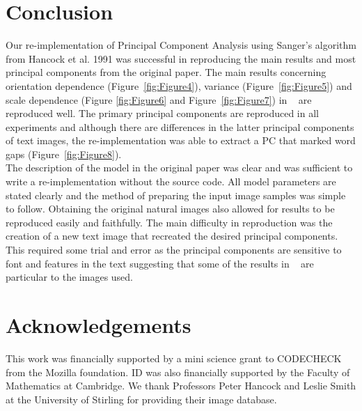 \section{Conclusion}
Our re-implementation of Principal Component Analysis using Sanger's algorithm from Hancock et al. 1991 was successful in reproducing the main results and most principal components from the original paper. The main results concerning orientation dependence (Figure~\ref{fig:Figure4}), variance (Figure~\ref{fig:Figure5}) and scale dependence (Figure \ref{fig:Figure6} and Figure~\ref{fig:Figure7}) in ~\cite{Hancock1991-mp} are reproduced well. The primary principal components are reproduced in all experiments and although there are differences in the latter principal components of text images, the re-implementation was able to extract a PC that marked word gaps (Figure~\ref{fig:Figure8}).\\
The description of the model in the original paper was clear and was sufficient to write a re-implementation without the source code. All model parameters are stated clearly and the method of preparing the input image samples was simple to follow. Obtaining the original natural images also allowed for results to be reproduced easily and faithfully. The main difficulty in reproduction was the creation of a new text image that recreated the desired principal components. This required some trial and error as the principal components are sensitive to font and features in the text suggesting that some of the results in ~\cite{Hancock1991-mp} are particular to the images used.

\section{Acknowledgements}
This work was financially supported by a mini science grant to CODECHECK
from the Mozilla foundation.  ID was also financially supported by the
Faculty of Mathematics at Cambridge.  We thank Professors Peter Hancock
and Leslie Smith at the University of Stirling for providing their
image database.
